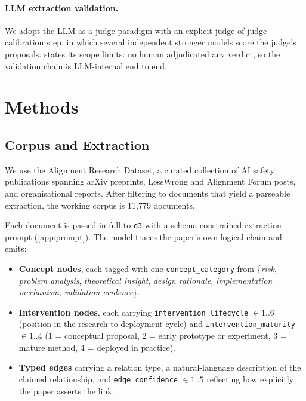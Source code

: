 \documentclass[10pt,twocolumn,letterpaper]{article}
\begin{document}
\paragraph{LLM extraction validation.}
We adopt the LLM-as-a-judge paradigm \citep{zheng2023judging} with an explicit
judge-of-judge calibration step, in which several independent stronger models
score the judge's proposals.  states its scope limits: no
human adjudicated any verdict, so the validation chain is LLM-internal end to
end.

\section{Methods}

\subsection{Corpus and Extraction}

We use the Alignment Research Dataset, a curated collection of AI safety
publications spanning arXiv preprints, LessWrong and Alignment Forum posts, and
organisational reports. After filtering to documents that yield a parseable
extraction, the working corpus is 11{,}779 documents.

Each document is passed in full to \texttt{o3} with a schema-constrained
extraction prompt (\cref{app:prompt}). The model traces the paper's own logical
chain and emits:

\begin{itemize}
\setlength{\itemsep}{0pt}
\item \textbf{Concept nodes}, each tagged with one \texttt{concept\_category}
from \{\emph{risk}, \emph{problem analysis}, \emph{theoretical insight},
\emph{design rationale}, \emph{implementation mechanism}, \emph{validation
evidence}\}.
\item \textbf{Intervention nodes}, each carrying
\texttt{intervention\_lifecycle} $\in 1..6$ (position in the research-to-deployment
cycle) and \texttt{intervention\_maturity} $\in 1..4$ (1 = conceptual proposal,
2 = early prototype or experiment, 3 = mature method, 4 = deployed in practice).
\item \textbf{Typed edges} carrying a relation type, a natural-language
description of the claimed relationship, and \texttt{edge\_confidence} $\in 1..5$
reflecting how explicitly the paper asserts the link.
\end{itemize}
\end{document}
